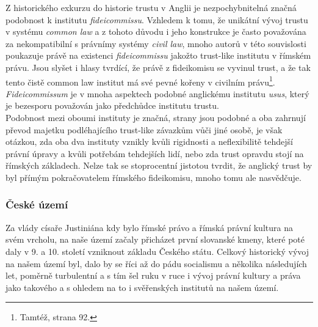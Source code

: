 \documentclass{article}
\begin{document}
Z historického exkurzu do historie trustu v Anglii je nezpochybnitelná značná podobnost k institutu \textit{fideicommissu}. Vzhledem k tomu, že unikátní vývoj trustu v systému \textit{common law} a z tohoto důvodu i jeho konstrukce je často považována za nekompatibilní s právnímy systémy \textit{civil law}, mnoho autorů v této souvislosti poukazuje právě na existenci \textit{fideicommissu} jakožto trust-like institutu v římském právu. Jsou slyšet i hlasy tvrdící, že právě z fideikomisu se vyvinul trust, a že tak tento čistě common law institut má své pevné kořeny v civilním právu\footnote{Tamtéž, strana 92.}. \textit{Fideicommissum} je v mnoha aspektech podobné anglickému institutu \textit{usus}, který je bezesporu považován jako předchůdce institutu trustu.\\

Podobnost mezi oboumi instituty je značná, strany jsou podobné a oba zahrnují převod majetku podléhajícího trust-like závazkům vůči jiné osobě, je však otázkou, zda oba dva instituty vznikly kvůli rigidnosti a neflexibilitě tehdejší právní úpravy a kvůli potřebám tehdejších lidí, nebo zda trust opravdu stojí na římských základech. Nelze tak se stoprocentní jistotou tvrdit, že anglický trust by byl přímým pokračovatelem římského fideikomisu, mnoho tomu ale nasvědčuje.


\subsubsection{České území}

Za vlády císaře Justiniána kdy bylo římské právo a římská právní kultura na svém vrcholu, na naše území začaly přicházet první slovanské kmeny, které poté daly v 9. a 10. století vzniknout základu Českého státu. Celkový historický vývoj na našem území byl, dalo by se říci až do pádu socialismu a několika následujích let, poměrně turbulentní a s tím šel ruku v ruce i vývoj právní kultury a práva jako takového a s ohledem na to i svěřenských institutů na našem území. \\
\end{document}
